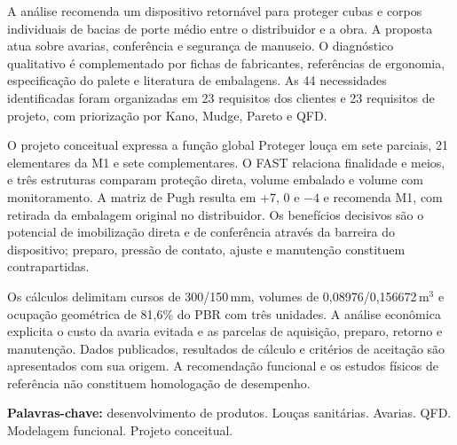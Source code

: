 \begin{resumorelatorio}
A análise recomenda um dispositivo retornável para proteger cubas e corpos individuais de bacias de porte médio entre o distribuidor e a obra. A proposta atua sobre avarias, conferência e segurança de manuseio. O diagnóstico qualitativo é complementado por fichas de fabricantes, referências de ergonomia, especificação do palete e literatura de embalagens. As 44 necessidades identificadas foram organizadas em 23 requisitos dos clientes e 23 requisitos de projeto, com priorização por Kano, Mudge, Pareto e QFD.

\vspace{0.5\baselineskip}
O projeto conceitual expressa a função global Proteger louça em sete parciais, 21 elementares da M1 e sete complementares. O FAST relaciona finalidade e meios, e três estruturas comparam proteção direta, volume embalado e volume com monitoramento. A matriz de Pugh resulta em +7, 0 e $-4$ e recomenda M1, com retirada da embalagem original no distribuidor. Os benefícios decisivos são o potencial de imobilização direta e de conferência através da barreira do dispositivo; preparo, pressão de contato, ajuste e manutenção constituem contrapartidas.

\vspace{0.5\baselineskip}
Os cálculos delimitam cursos de 300/150\,mm, volumes de 0,08976/0,156672\,m$^3$ e ocupação geométrica de 81,6\% do PBR com três unidades. A análise econômica explicita o custo da avaria evitada e as parcelas de aquisição, preparo, retorno e manutenção. Dados publicados, resultados de cálculo e critérios de aceitação são apresentados com sua origem. A recomendação funcional e os estudos físicos de referência não constituem homologação de desempenho.

\vspace{0.5\baselineskip}
\noindent\textbf{Palavras-chave:} desenvolvimento de produtos. Louças sanitárias. Avarias. QFD. Modelagem funcional. Projeto conceitual.
\end{resumorelatorio}

\clearpage
